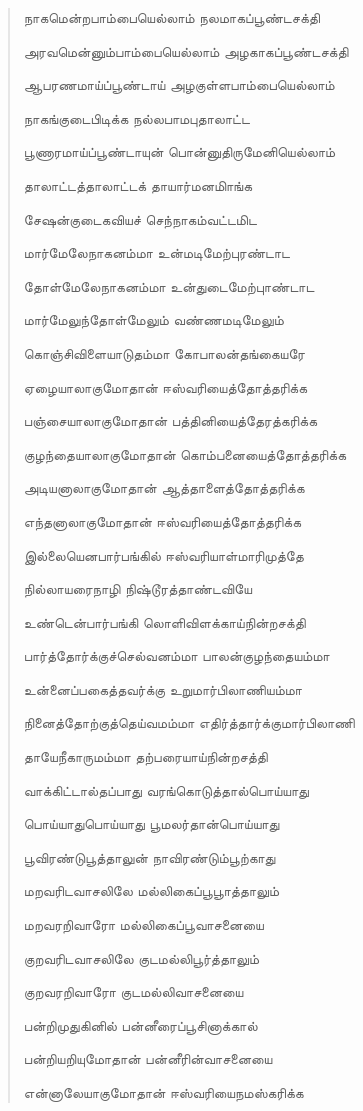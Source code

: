 \documentclass{article}
\begin{document}
\begin{quotation}
{நாகமென்றபாம்பையெல்லாம் நலமாகப்பூண்டசக்தி

அரவமென்னும்பாம்பையெல்லாம் அழகாகப்பூண்டசக்தி

ஆபரணமாய்ப்பூண்டாய் அழகுள்ளபாம்பையெல்லாம்

நாகங்குடைபிடிக்க நல்லபாமபுதாலாட்ட

பூணாரமாய்ப்பூண்டாயுன் பொன்னுதிருமேனியெல்லாம்

தாலாட்டத்தாலாட்டக் தாயார்மனமிாங்க

சேஷன்குடைகவியச் செந்நாகம்வட்டமிட

மார்மேலேநாகனம்மா உன்மடிமேற்புரண்டாட

தோள்மேலேநாகனம்மா உன்துடைமேற்புாண்டாட

மார்மேலுந்தோள்மேலும் வண்ணமடிமேலும்

கொஞ்சிவிளையாடுதம்மா கோபாலன்தங்கையரே

ஏழையாலாகுமோதான் ஈஸ்வரியைத்தோத்தரிக்க

பஞ்சையாலாகுமோதான்‌ பத்தினியைத்தேரத்கரிக்க

குழந்தையாலாகுமோதான் கொம்பனையைத்தோத்தரிக்க

அடியனாலாகுமோதான் ஆத்தாளைத்தோத்தரிக்க

எந்தனாலாகுமோதான் ஈஸ்வரியைத்தோத்தரிக்க

இல்லையெனபார்பங்கில் ஈஸ்வரியாள்மாரிமுத்தே

நில்லாயரைநாழி நிஷ்டூரத்தாண்டவியே

உண்டென்பார்பங்கி லொளிவிளக்காய்நின்றசக்தி

பார்த்தோர்க்குச்செல்வனம்மா பாலன்குழந்தையம்மா

உன்னைப்பகைத்தவர்க்கு உறுமார்பிலாணியம்மா

நினைத்தோற்குத்தெய்வமம்மா எதிர்த்தார்க்குமார்பிலாணி

தாயேநீகாருமம்மா தற்பரையாய்நின்றசத்தி

வாக்கிட்டால்தப்பாது வரங்கொடுத்தால்பொய்யாது

பொய்யாதுபொய்யாது பூமலர்தான்பொய்யாது

பூவிரண்டுபூத்தாலுன் நாவிரண்டும்பூற்காது

மறவரிடவாசலிலே மல்லிகைப்பூபூாத்தாலும்

மறவரறிவாரோ மல்லிகைப்பூவாசனையை

குறவரிடவாசலிலே குடமல்லிபூர்த்தாலும்

குறவரறிவாரோ குடமல்லிவாசனையை

பன்றிமுதுகினில் பன்னீரைப்பூசினாக்கால்

பன்றியறியுமோதான் பன்னீரின்வாசனையை

என்னாலேயாகுமோதான் ஈஸ்வரியைநமஸ்கரிக்க

}
\end{quotation}
\end{document}
